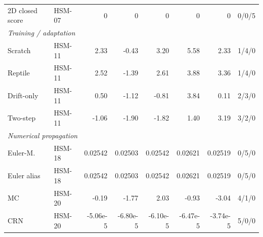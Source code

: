 \begin{longtable}{@{}p{.22\linewidth}p{.07\linewidth}rrrrrr@{}}
2D closed score & HSM-07 & 0 & 0 & 0 & 0 & 0 & 0/0/5\\
\multicolumn{8}{l}{\textit{Training / adaptation}}\\
Scratch & HSM-11 & 2.33 & -0.43 & 3.20 & 5.58 & 2.33 & 1/4/0\\
Reptile & HSM-11 & 2.52 & -1.39 & 2.61 & 3.88 & 3.36 & 1/4/0\\
Drift-only & HSM-11 & 0.50 & -1.12 & -0.81 & 3.84 & 0.11 & 2/3/0\\
Two-step & HSM-11 & -1.06 & -1.90 & -1.82 & 1.40 & 3.19 & 3/2/0\\
\multicolumn{8}{l}{\textit{Numerical propagation}}\\
Euler-M. & HSM-18 & 0.02542 & 0.02503 & 0.02542 & 0.02621 & 0.02519 & 0/5/0\\
Euler alias & HSM-18 & 0.02542 & 0.02503 & 0.02542 & 0.02621 & 0.02519 & 0/5/0\\
MC & HSM-20 & -0.19 & -1.77 & 2.03 & -0.93 & -3.04 & 4/1/0\\
CRN & HSM-20 & -5.06e-5 & -6.80e-5 & -6.10e-5 & -6.47e-5 & -3.74e-5 & 5/0/0\\
\end{longtable}
\endgroup
